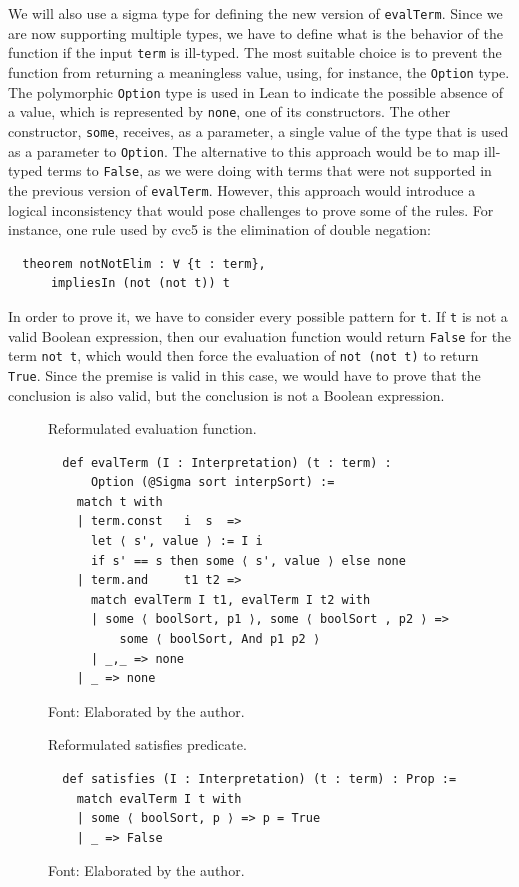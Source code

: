 We will also use a sigma type for defining the new version of \texttt{evalTerm}.
%
Since we are now supporting multiple types, we have to define what is the behavior
of the function if the input \texttt{term} is ill-typed.
The most suitable choice is to prevent the function from returning
a meaningless value, using, for instance, the \texttt{Option} type. The polymorphic
\texttt{Option} type is used in Lean to indicate the possible absence of a value,
which is represented by \texttt{none}, one of its constructors. The other
constructor, \texttt{some}, receives, as a parameter, a single value
of the type that is used as a parameter to \texttt{Option}.
The alternative to this approach would be to map ill-typed
terms to \texttt{False}, as we were doing with terms that were not supported
in the previous version of \texttt{evalTerm}.
However, this approach would introduce
a logical inconsistency that would pose challenges to prove some of the rules.
For instance, one rule used by cvc5 is the elimination of double negation:

\begin{verbatim}
  theorem notNotElim : ∀ {t : term},
      impliesIn (not (not t)) t
\end{verbatim}

In order to prove it, we have to consider every possible pattern for \texttt{t}.
If \texttt{t} is not a valid Boolean expression, then our evaluation function would
return \texttt{False} for the term \texttt{not t}, which would then force the
evaluation of \texttt{not (not t)} to return \texttt{True}. Since the premise
is valid in this case, we would have to prove that the conclusion is also valid,
but the conclusion is not a Boolean expression.


\begin{figure}[t]
\caption{Reformulated evaluation function.}\label{evalTerm2}
\begin{verbatim}
  def evalTerm (I : Interpretation) (t : term) :
      Option (@Sigma sort interpSort) :=
    match t with
    | term.const   i  s  =>
      let ⟨ s', value ⟩ := I i
      if s' == s then some ⟨ s', value ⟩ else none
    | term.and     t1 t2 =>
      match evalTerm I t1, evalTerm I t2 with
      | some ⟨ boolSort, p1 ⟩, some ⟨ boolSort , p2 ⟩ =>
          some ⟨ boolSort, And p1 p2 ⟩
      | _,_ => none
    | _ => none
\end{verbatim}
\caption*{Font: Elaborated by the author.}
\end{figure}


\begin{figure}[t]
\caption{Reformulated satisfies predicate.}\label{satisfiesPred}
\begin{verbatim}
  def satisfies (I : Interpretation) (t : term) : Prop :=
    match evalTerm I t with
    | some ⟨ boolSort, p ⟩ => p = True
    | _ => False
\end{verbatim}
\caption*{Font: Elaborated by the author.}
\end{figure}


